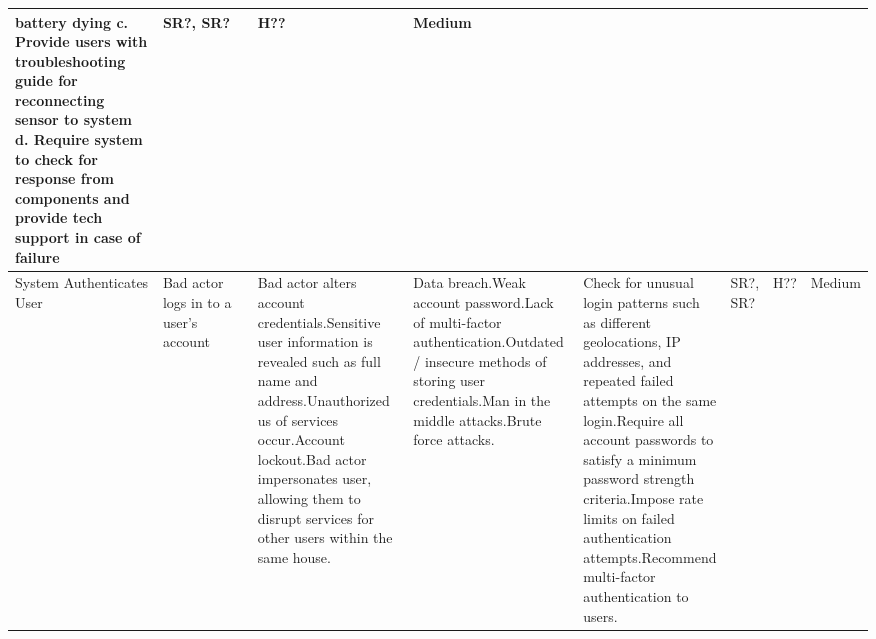 \documentclass{article}
\begin{document}
\begin{table}[H]
\begin{adjustbox}{width=\textwidth}
\begin{tabular}{|p{0.27\linewidth} | p{0.25\linewidth} | p{0.22\linewidth}|  p{0.22\linewidth}|  p{0.30\linewidth}|  p{0.07\linewidth}|  p{0.07\linewidth}|p{0.12\linewidth}| }
battery dying \newline c. Provide users with troubleshooting guide for reconnecting sensor to system \newline d. Require system to check for response from components and provide tech support in case of failure   & SR?, SR? & H?? & Medium\\
         \hline
         System Authenticates User & Bad actor logs in to a user's account& Bad actor alters account credentials.\newline\newline Sensitive user information is revealed such as full name and address.\newline\newline Unauthorized us of services occur.\newline\newline Account lockout.\newline\newline Bad actor impersonates user, allowing them to disrupt services for other users within the same house. & Data breach.\newline\newline Weak account password.\newline\newline Lack of multi-factor authentication.\newline\newline Outdated / insecure methods of storing user credentials.\newline\newline Man in the middle attacks.\newline\newline Brute force attacks. & Check for unusual login patterns such as different geolocations, IP addresses, and repeated failed attempts on the same login.\newline\newline Require all account passwords to satisfy a minimum password strength criteria.\newline\newline Impose rate limits on failed authentication attempts.\newline\newline Recommend multi-factor authentication to users. & SR?, SR? & H?? & Medium\\
         \hline
         

\end{tabular}
\end{adjustbox}
\end{table}
\end{document}
